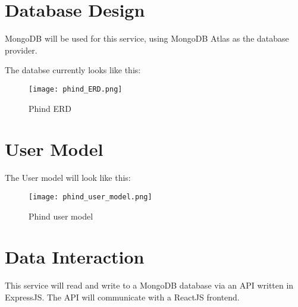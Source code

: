 \section{Database Design}
MongoDB will be used for this service, using MongoDB Atlas as the database provider.

The databse currently looks like this:
\begin{figure}[ht]
    \centering
    \texttt{[image: phind\_ERD.png]}
    \caption{Phind ERD}
    \label{}
\end{figure}

\section{User Model}
The User model will look like this:

\begin{figure}[ht]
    \centering
    \texttt{[image: phind\_user\_model.png]}
    \caption{Phind user model}
    \label{find use}
\end{figure}

\section{Data Interaction}
This service will read and write to a MongoDB database via an API written in ExpressJS. The API will communicate
with a ReactJS frontend.